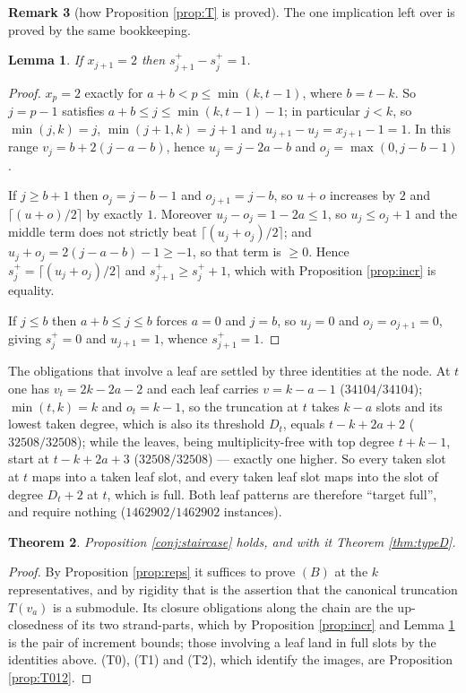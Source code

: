 \documentclass[11pt,reqno]{amsart}
\theoremstyle{plain}
\newtheorem{theorem}{Theorem}[section]
\newtheorem{lemma}[theorem]{Lemma}
\theoremstyle{definition}
\newtheorem{remark}[theorem]{Remark}
\begin{document}
\begin{remark}[how Proposition \ref{prop:T} is proved]
The one implication left over is proved by the same bookkeeping.

\begin{lemma}\label{lem:jump2}
If $x_{j+1}=2$ then $s^{+}_{j+1}-s^{+}_j=1$.
\end{lemma}

\begin{proof}
$x_p=2$ exactly for $a+b<p\le\min(k,t-1)$, where $b=t-k$.  So $j=p-1$ satisfies
$a+b\le j\le\min(k,t-1)-1$; in particular $j<k$, so $\min(j,k)=j$,
$\min(j+1,k)=j+1$ and $u_{j+1}-u_j=x_{j+1}-1=1$.  In this range
$v_j=b+2(j-a-b)$, hence $u_j=j-2a-b$ and $o_j=\max(0,j-b-1)$.

If $j\ge b+1$ then $o_j=j-b-1$ and $o_{j+1}=j-b$, so $u+o$ increases by $2$ and
$\lceil(u+o)/2\rceil$ by exactly $1$.  Moreover $u_j-o_j=1-2a\le1$, so
$u_j\le o_j+1$ and the middle term does not strictly beat
$\lceil(u_j+o_j)/2\rceil$; and $u_j+o_j=2(j-a-b)-1\ge-1$, so that term is
$\ge0$.  Hence $s^{+}_j=\lceil(u_j+o_j)/2\rceil$ and
$s^{+}_{j+1}\ge s^{+}_j+1$, which with Proposition \ref{prop:incr} is equality.

If $j\le b$ then $a+b\le j\le b$ forces $a=0$ and $j=b$, so $u_j=0$ and
$o_j=o_{j+1}=0$, giving $s^{+}_j=0$ and $u_{j+1}=1$, whence $s^{+}_{j+1}=1$.
\end{proof}

The obligations that involve a leaf are settled by three identities at the node.
At $t$ one has $v_t=2k-2a-2$ and each leaf carries $v=k-a-1$ ($34104/34104$);
$\min(t,k)=k$ and $o_t=k-1$, so the truncation at $t$ takes $k-a$ slots and its
lowest taken degree, which is also its threshold $D_t$, equals $t-k+2a+2$
($32508/32508$); while the leaves, being multiplicity-free with top degree
$t+k-1$, start at $t-k+2a+3$ ($32508/32508$) --- exactly one higher.  So every
taken slot at $t$ maps into a taken leaf slot, and every taken leaf slot maps
into the slot of degree $D_t+2$ at $t$, which is full.  Both leaf patterns are
therefore ``target full'', and require nothing ($1462902/1462902$ instances).

\begin{theorem}\label{thm:staircase}
Proposition \ref{conj:staircase} holds, and with it Theorem \ref{thm:typeD}.
\end{theorem}

\begin{proof}
By Proposition \ref{prop:reps} it suffices to prove $(B)$ at the $k$
representatives, and by rigidity that is the assertion that the canonical
truncation $T(v_a)$ is a submodule.  Its closure obligations along the chain are
the up-closedness of its two strand-parts, which by Proposition \ref{prop:incr}
and Lemma \ref{lem:jump2} is the pair of increment bounds; those involving a
leaf land in full slots by the identities above.  (T0), (T1) and (T2), which
identify the images, are Proposition \ref{prop:T012}.
\end{proof}


\end{remark}
\end{document}
